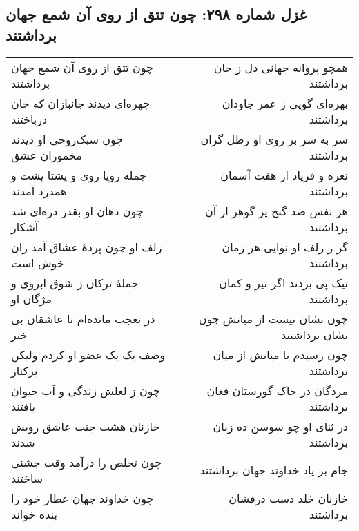 \begin{center}
\section*{غزل شماره ۲۹۸: چون تتق از روی آن شمع جهان برداشتند}
\label{sec:298}
\begin{longtable}{l p{0.5cm} r}
چون تتق از روی آن شمع جهان برداشتند
&&
همچو پروانه جهانی دل ز جان برداشتند
\\
چهره‌ای دیدند جانبازان که جان درباختند
&&
بهره‌ای گویی ز عمر جاودان برداشتند
\\
چون سبک‌روحی او دیدند مخموران عشق
&&
سر به سر بر روی او رطل گران برداشتند
\\
جمله رویا روی و پشتا پشت و همدرد آمدند
&&
نعره و فریاد از هفت آسمان برداشتند
\\
چون دهان او بقدر ذره‌ای شد آشکار
&&
هر نفس صد گنج پر گوهر از آن برداشتند
\\
زلف او چون پردهٔ عشاق آمد زان خوش است
&&
گر ز زلف او نوایی هر زمان برداشتند
\\
جملهٔ ترکان ز شوق ابروی و مژگان او
&&
نیک پی بردند اگر تیر و کمان برداشتند
\\
در تعجب مانده‌ام تا عاشقان بی خبر
&&
چون نشان نیست از میانش چون نشان برداشتند
\\
وصف یک یک عضو او کردم ولیکن برکنار
&&
چون رسیدم با میانش از میان برداشتند
\\
چون ز لعلش زندگی و آب حیوان یافتند
&&
مردگان در خاک گورستان فغان برداشتند
\\
خازنان هشت جنت عاشق رویش شدند
&&
در ثنای او چو سوسن ده زبان برداشتند
\\
چون تخلص را درآمد وقت جشنی ساختند
&&
جام بر یاد خداوند جهان برداشتند
\\
چون خداوند جهان عطار خود را بنده خواند
&&
خازنان خلد دست درفشان برداشتند
\\
\end{longtable}
\end{center}
